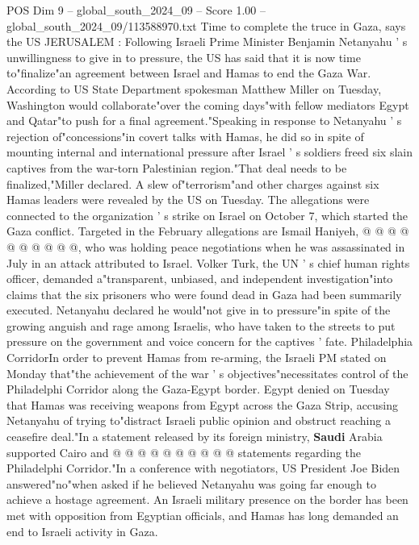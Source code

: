\begin{textsample}{POS Dim 9 – global\_south\_2024\_09 – Score 1.00 – global\_south\_2024\_09/113588970.txt}  \label{ex:f9_pos_343}
Time to complete the truce in Gaza, says the US JERUSALEM : Following Israeli Prime Minister Benjamin Netanyahu ' s unwillingness to give in to pressure, the US has said that it is now time to"finalize"an agreement between Israel and Hamas to end the Gaza War.
According to US State Department spokesman Matthew Miller on Tuesday, Washington would collaborate"over the coming days"with fellow mediators Egypt and Qatar"to push for a final agreement."Speaking in response to Netanyahu ' s rejection of"concessions"in covert talks with Hamas, he did so in spite of mounting internal and international pressure after Israel ' s soldiers freed six slain captives from the war-torn Palestinian region."That deal needs to be finalized,"Miller declared.
A slew of"terrorism"and other charges against six Hamas leaders were revealed by the US on Tuesday.
The allegations were connected to the organization ' s strike on Israel on October 7, which started the Gaza conflict.
Targeted in the February allegations are Ismail Haniyeh, @ @ @ @ @ @ @ @ @ @, who was holding peace negotiations when he was assassinated in July in an attack attributed to Israel.
Volker Turk, the UN ' s chief human rights officer, demanded a"transparent, unbiased, and independent investigation"into claims that the six prisoners who were found dead in Gaza had been summarily executed.
Netanyahu declared he would"not give in to pressure"in spite of the growing anguish and rage among Israelis, who have taken to the streets to put pressure on the government and voice concern for the captives ' fate.
Philadelphia CorridorIn order to prevent Hamas from re-arming, the Israeli PM stated on Monday that"the achievement of the war ' s objectives"necessitates control of the Philadelphi Corridor along the Gaza-Egypt border.
Egypt denied on Tuesday that Hamas was receiving weapons from Egypt across the Gaza Strip, accusing Netanyahu of trying to"distract Israeli public opinion and obstruct reaching a ceasefire deal."In a statement released by its foreign ministry, \textbf{Saudi} Arabia supported Cairo and @ @ @ @ @ @ @ @ @ @ statements regarding the Philadelphi Corridor."In a conference with negotiators, US President Joe Biden answered"no"when asked if he believed Netanyahu was going far enough to achieve a hostage agreement.
An Israeli military presence on the border has been met with opposition from Egyptian officials, and Hamas has long demanded an end to Israeli activity in Gaza.

\end{textsample}
